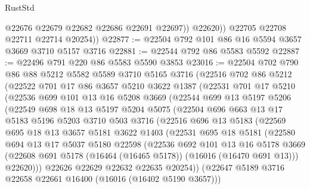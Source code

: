 \begin{lexlean}{RustStd}
\begin{coremodule}
                @22676
                @22679
                @22682
                @22686
                @22691
                @22697))
            @22620))
        @22705
        @22708
        @22711
        @22714
        @20254))
@22877 := @22504 @792 @101 @86 @16 @5594 @3657 @3669 @3710 @5157 @3716
@22881 := @22544 @792 @86 @5583 @5592
@22887 := @22496 @791 @220 @86 @5583 @5590 @3853
@23016 := @22504
    @702
    @790
    @86
    @88
    @5212
    @5582
    @5589
    @3710
    @5165
    @3716
    (@22516
      @702
      @86
      @5212
      (@22522
        @701
        @17
        @86
        @3657
        @5210
        @3622
        @1387
        (@22531
          @701
          @17
          @5210
          (@22536
            @699
            @101
            @13
            @16
            @5208
            @3669
            (@22544
              @699
              @13
              @5197
              @5206
              (@22549
                @698
                @18
                @13
                @5197
                @5204
                @5075
                (@22504
                  @696
                  @663
                  @13
                  @17
                  @5183
                  @5196
                  @5203
                  @3710
                  @503
                  @3716
                  (@22516
                    @696
                    @13
                    @5183
                    (@22569
                      @695
                      @18
                      @13
                      @3657
                      @5181
                      @3622
                      @1403
                      (@22531
                        @695
                        @18
                        @5181
                        (@22580
                          @694
                          @13
                          @17
                          @5037
                          @5180
                          @22598
                          (@22536
                            @692
                            @101
                            @13
                            @16
                            @5178
                            @3669
                            (@22608 @691 @5178 (@16464 (@16465 @5178)) (@16016 (@16470 @691 @13)))
                            @22620)))
                      @22626
                      @22629
                      @22632
                      @22635
                      @20254))
                  (@22647 @5189 @3716 @22658 @22661 @16400 (@16016 (@16402 @5190 @3657)))

\end{coremodule}
\end{lexlean}
